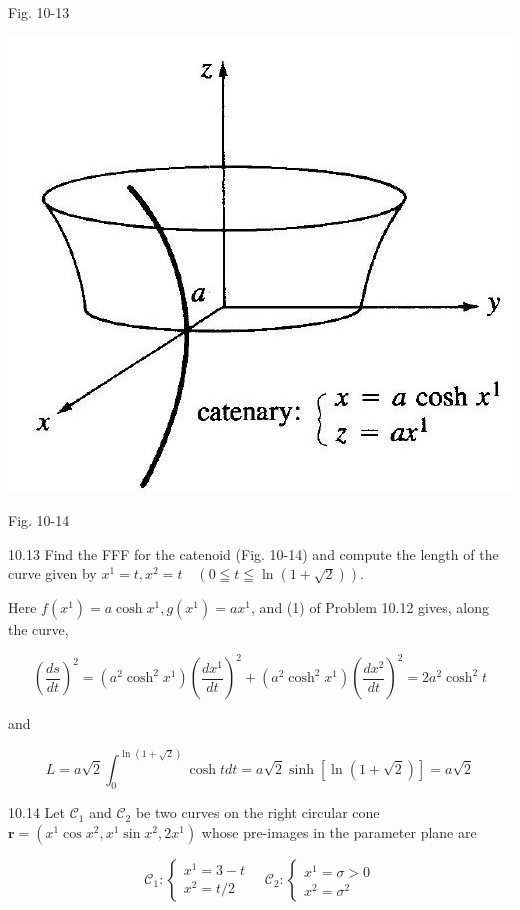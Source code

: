 \documentclass[10pt]{article}
\begin{document}
Fig. 10-13

\begin{center}
\includegraphics[max width=\textwidth]{2024_04_03_41f90be4f896e21f0dc9g-154(1)}
\end{center}

Fig. 10-14

10.13 Find the FFF for the catenoid (Fig. 10-14) and compute the length of the curve given by $x^{1}=t, x^{2}=t \quad(0 \leqq t \leqq \ln (1+\sqrt{2}))$.

Here $f\left(x^{1}\right)=a \cosh x^{1}, g\left(x^{1}\right)=a x^{1}$, and (1) of Problem 10.12 gives, along the curve,

$$
\left(\frac{d s}{d t}\right)^{2}=\left(a^{2} \cosh ^{2} x^{1}\right)\left(\frac{d x^{1}}{d t}\right)^{2}+\left(a^{2} \cosh ^{2} x^{1}\right)\left(\frac{d x^{2}}{d t}\right)^{2}=2 a^{2} \cosh ^{2} t
$$

and

$$
L=a \sqrt{2} \int_{0}^{\ln (1+\sqrt{2})} \cosh t d t=a \sqrt{2} \sinh [\ln (1+\sqrt{2})]=a \sqrt{2}
$$

10.14 Let $\mathscr{C}_{1}$ and $\mathscr{C}_{2}$ be two curves on the right circular cone $\mathbf{r}=\left(x^{1} \cos x^{2}, x^{1} \sin x^{2}, 2 x^{1}\right)$ whose pre-images in the parameter plane are

$$
\mathscr{C}_{1}:\left\{\begin{array}{l}
x^{1}=3-t \\
x^{2}=t / 2
\end{array} \quad \mathscr{C}_{2}:\left\{\begin{array}{l}
x^{1}=\sigma>0 \\
x^{2}=\sigma^{2}
\end{array}\right.\right.
$$
\end{document}
